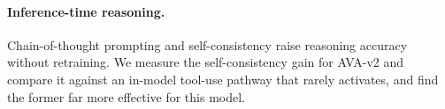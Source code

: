 \paragraph{Inference-time reasoning.}
Chain-of-thought prompting \citep{wei2022cot} and self-consistency \citep{wang2022selfconsistency} raise reasoning accuracy without retraining. We measure the self-consistency gain for AVA-v2 and compare it against an in-model tool-use pathway that rarely activates, and find the former far more effective for this model.

